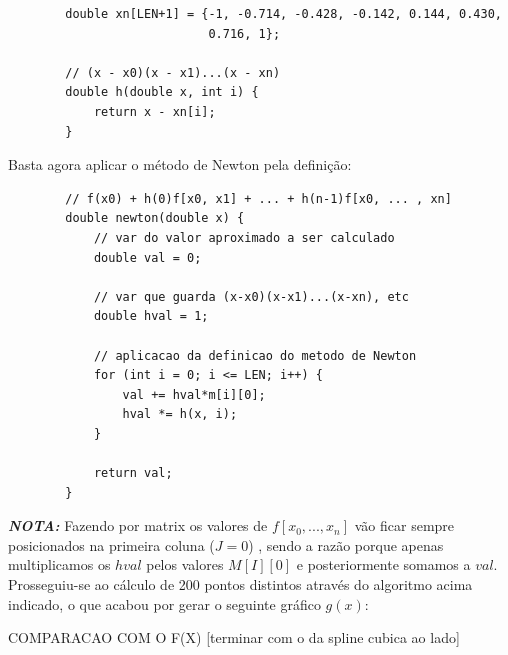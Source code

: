 \documentclass[12pt, letterpaper,fleqn]{article}
\begin{document}
\begin{itemize}
    \begin{verbatim}
        double xn[LEN+1] = {-1, -0.714, -0.428, -0.142, 0.144, 0.430, 
                            0.716, 1};
                            
        // (x - x0)(x - x1)...(x - xn)
        double h(double x, int i) {
            return x - xn[i];
        }
    \end{verbatim}

    Basta agora aplicar o método de Newton pela definição:

    \begin{verbatim}
        // f(x0) + h(0)f[x0, x1] + ... + h(n-1)f[x0, ... , xn]
        double newton(double x) {
            // var do valor aproximado a ser calculado
            double val = 0;
        
            // var que guarda (x-x0)(x-x1)...(x-xn), etc
            double hval = 1;
        
            // aplicacao da definicao do metodo de Newton
            for (int i = 0; i <= LEN; i++) {
                val += hval*m[i][0];
                hval *= h(x, i);
            }
            
            return val;
        }
    \end{verbatim}

    \textbf{\textit{NOTA:}} Fazendo por matrix os valores de $f[x_0, ... , x_n]$ vão ficar sempre posicionados na primeira coluna ($J=0$) , sendo a razão porque apenas multiplicamos os $hval$ pelos valores $M[I][0]$ e posteriormente somamos a $val$. \\

    Prosseguiu-se ao cálculo de 200 pontos distintos através do algoritmo acima indicado, o que acabou por gerar o seguinte gráfico $g(x)$:

    \begin{quote}
        \centering
    \end{quote}

    COMPARACAO COM O F(X) [terminar com o da spline cubica ao lado]

    \begin{quote}
        \centering
    \end{quote}
    

\end{itemize}
\end{document}
